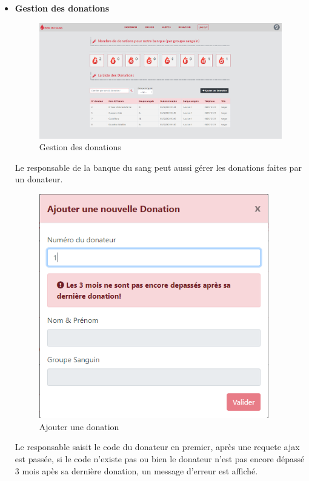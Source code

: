 \documentclass[12pt,a4paper,twoside]{report}
\begin{document}
{{\begin{itemize}
					\item \textbf{Gestion des donations}
					\begin{figure}[H]
									 \includegraphics[width=13cm]{Images/don.png}
									 \centering
									 \caption{\label{don} Gestion des donations}
								\end{figure}
								Le responsable de la banque du sang peut aussi gérer les donations faites par un donateur.
					\begin{figure}[H]
									 \includegraphics[width=10cm]{Images/ajoutDon.png}
									 \centering
									 \caption{\label{adon} Ajouter une donation}
								\end{figure}
								Le responsable saisit le code du donateur en premier, après une requete ajax est passée, si le code n'existe pas ou bien le donateur n'est pas encore dépassé 3 mois apès sa dernière donation, un message d'erreur est affiché.
			\end{itemize}
		}
}
\end{document}
